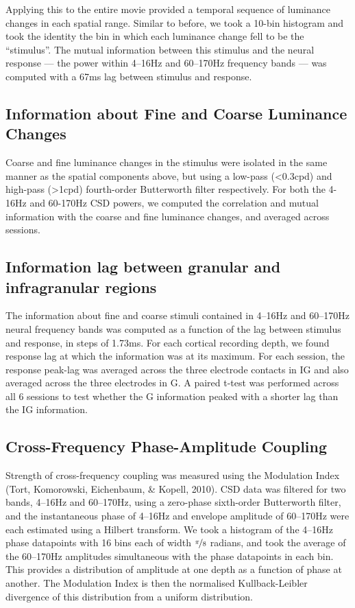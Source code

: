 Applying this to the entire movie provided a temporal sequence of luminance changes in each spatial range. Similar to before, we took a 10-bin histogram and took the identity the bin in which each luminance change fell to be the ``stimulus''. The mutual information between this stimulus and the neural response --- the power within 4--16Hz and 60--170Hz frequency bands --- was computed with a 67ms lag between stimulus and response.

\subsection{Information about Fine and Coarse Luminance Changes}
Coarse and fine luminance changes in the stimulus were isolated in the same manner as the spatial components above, but using a low-pass ({\textless}0.3cpd) and high-pass ({\textgreater}1cpd) fourth-order Butterworth filter respectively. For both the 4-16Hz and 60-170Hz CSD powers, we computed the correlation and mutual information with the coarse and fine luminance changes, and averaged across sessions.

\subsection[Information lag between granular and infragranular regions]{Information lag between granular and infragranular regions}
The information about fine and coarse stimuli contained in 4--16Hz and 60--170Hz neural frequency bands was computed as a function of the lag between stimulus and response, in steps of 1.73ms. For each cortical recording depth, we found response lag at which the information was at its maximum. For each session, the response peak-lag was averaged across the three electrode contacts in IG and also averaged across the three electrodes in G. A paired t-test was performed across all 6 sessions to test whether the G information peaked with a shorter lag than the IG information.

\subsection{Cross-Frequency Phase-Amplitude Coupling}
Strength of cross-frequency coupling was measured using the Modulation Index (Tort, Komorowski, Eichenbaum, \& Kopell, 2010). CSD data was filtered for two bands, 4--16Hz and 60--170Hz, using a zero-phase sixth-order Butterworth filter, and the instantaneous phase of 4--16Hz and envelope amplitude of 60--170Hz were each estimated using a Hilbert transform. We took a histogram of the 4--16Hz phase datapoints with 16 bins each of width $\nicefrac{\pi}{8}$ radians, and took the average of the 60--170Hz amplitudes simultaneous with the phase datapoints in each bin. This provides a distribution of amplitude at one depth as a function of phase at another. The Modulation Index is then the normalised Kullback-Leibler divergence of this distribution from a uniform distribution.

